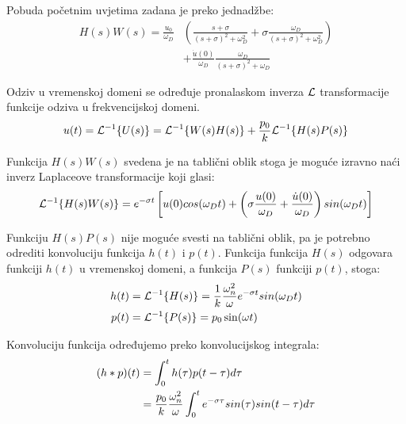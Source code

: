 Pobuda početnim uvjetima zadana je preko jednadžbe:
\begin{equation}
    \begin{split}
        H(s)W(s)=\frac{u_0}{\omega_D}&\left(
        \frac{s+\sigma}{(s+\sigma)^2+\omega_D^2} +
	\sigma\frac{\omega_D}{(s+\sigma)^2+\omega_D^2}\right)\\
        &+ \frac{\dot{u}(0)}{\omega_D}\frac{\omega_D}{(s+\sigma)^2+\omega_D}
    \end{split}
\end{equation}

Odziv u vremenskoj domeni se određuje pronalaskom inverza $\mathcal{L}$ transformacije
funkcije odziva u frekvencijskoj domeni.
\begin{equation}
	u(t)=\mathcal{L}^{-1}\{U(s)\}=\mathcal{L}^{-1}\{W(s)H(s)\}+\frac{p_0}{k}\mathcal{L}^{-1}\{H(s)P(s)\}
	\label{eq:inverz_prvi_korak}
\end{equation}

Funkcija $H(s)W(s)$ svedena je na tablični oblik stoga je moguće izravno naći inverz
Laplaceove transformacije koji glasi:
\begin{equation}
	\mathcal{L}^{-1}\{H(s)W(s)\} = e^{-\sigma t}\left[
		u(0)cos(\omega_Dt)+\left(
			\sigma\frac{u(0)}{\omega_D}+\frac{\dot{u}(0)}{\omega_D}
			\right)sin(\omega_Dt)\right] \label{eq:pobuda_pocetnim_uvjetima}
\end{equation}

Funkciju $H(s)P(s)$ nije moguće svesti na tablični oblik, pa je potrebno odrediti
konvoluciju funkcija $h(t)$ i $p(t)$. Funkcija funkcija $H(s)$ odgovara funkciji 
$h(t)$ u vremenskoj domeni, a funkcija $P(s)$ funkciji $p(t)$, stoga:
\begin{align}
        h(t)&=\mathcal{L}^{-1}\{H(s)\}=\frac{1}{k}\frac{\omega_n^2}{\omega}e^{-\sigma t}sin(\omega_Dt)\label{eq:pfs_vremenska_domena}\\
	p(t)&=\mathcal{L}^{-1}\{P(s)\}=p_0\sin(\omega t) \label{eq:pobuda_vremenska_domena}
\end{align}

Konvoluciju funkcija određujemo preko konvolucijskog integrala:
\begin{align}\label{eq:konvolucijski_integral}
	(h*p)(t)&=\int_0^th(\tau)p(t-\tau)d\tau \notag\\
		&=\frac{p_0}{k}\frac{\omega_n^2}{\omega}
		\int_0^te^{-\sigma\tau}sin(\tau)sin(t-\tau)d\tau
\end{align}

